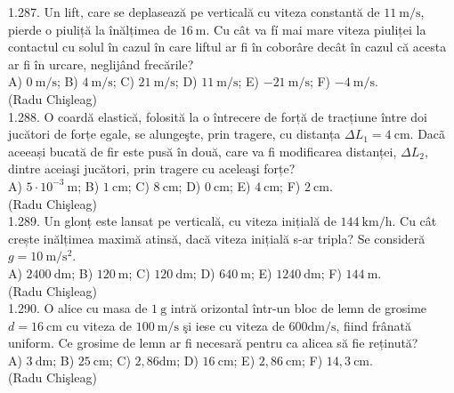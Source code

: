 {1.287. Un lift, care se deplasează pe verticală cu viteza constantă de $11 \mathrm{~m} / \mathrm{s}$, pierde o piuliță la înălțimea de $16 \mathrm{~m}$. Cu cât va fí mai mare viteza piuliței la contactul cu solul în cazul în care liftul ar fi în coborâre decât în cazul că acesta ar fi în urcare, neglijând frecările?\\ A) $0 \mathrm{~m} / \mathrm{s}$; B) $4 \mathrm{~m} / \mathrm{s}$; C) $21 \mathrm{~m} / \mathrm{s}$; D) $11 \mathrm{~m} / \mathrm{s}$; E) $-21 \mathrm{~m} / \mathrm{s}$; F) $-4 \mathrm{~m} / \mathrm{s}$.\\ (Radu Chişleag)\\

1.288. O coardă elastică, folosită la o întrecere de forță de tracțiune între doi jucători de forțe egale, se alungeşte, prin tragere, cu distanța $\Delta L_{1}=4 \mathrm{~cm}$. Dacã aceeași bucată de fir este pusă în două, care va fi modificarea distanței, $\Delta L_{2}$, dintre aceiaşi jucători, prin tragere cu aceleaşi forțe?\\ A) $5 \cdot 10^{-3} \mathrm{~m}$; B) $1 \mathrm{~cm}$; C) $8 \mathrm{~cm}$; D) $0 \mathrm{~cm}$; E) $4 \mathrm{~cm}$; F) $2 \mathrm{~cm}$.\\ (Radu Chişleag)\\

1.289. Un glonț este lansat pe verticală, cu viteza inițială de $144 \mathrm{~km} / \mathrm{h}$. Cu cât crește inălțimea maximă atinsă, dacă viteza inițială s-ar tripla? Se consideră $g=10 \mathrm{~m} / \mathrm{s}^{2}$.\\ A) $2400 \mathrm{~dm}$; B) $120 \mathrm{~m}$; C) $120 \mathrm{~dm}$; D) $640 \mathrm{~m}$; E) $1240 \mathrm{~dm}$; F) $144 \mathrm{~m}$.\\ (Radu Chişleag)\\

1.290. O alice cu masa de $1 \mathrm{~g}$ intră orizontal într-un bloc de lemn de grosime $d=16 \mathrm{~cm}$ cu viteza de $100 \mathrm{~m} / \mathrm{s}$ şi iese cu viteza de $600 \mathrm{dm} / \mathrm{s}$, fiind frânată uniform. Ce grosime de lemn ar fi necesară pentru ca alicea să fie reținută?\\ A) $3 \mathrm{~dm}$; B) $25 \mathrm{~cm}$; C) $2,86 \mathrm{dm}$; D) $16 \mathrm{~cm}$; E) $2,86 \mathrm{~cm}$; F) $14,3 \mathrm{~cm}$.\\ (Radu Chişleag)\\

}
